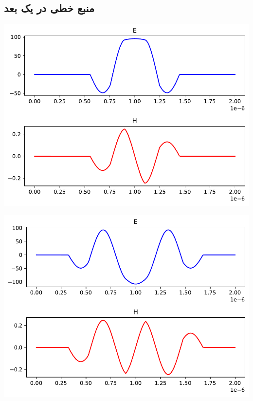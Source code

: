 \documentclass[12pt,a4paper]{article}
\begin{document}
	\subsection{منبع خطی در یک بعد}
	\begin{center}
		\includegraphics{line1d2}
	\end{center}
	\begin{center}
		\includegraphics{line1d}
	\end{center}
\end{document}
